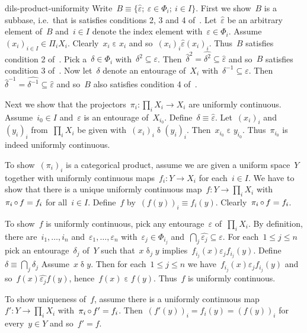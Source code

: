 \spacingfix
\begin{solution}{dils-product-uniformity}%
Write~$B \equiv \{ \hat\varepsilon; \ \varepsilon \in \Phi_i;\ i \in I\}$.
First we show~$B$ is a subbase,
    i.e.~that is satisfies conditions 2, 3 and 4
    of~.
Let~$\hat\varepsilon$ be an arbitrary element of~$B$
    and~$i \in I$ denote the index element with~$\varepsilon \in \Phi_i$.
    Assume~$(x_i)_{i \in I} \in \Pi_i X_i$.
Clearly~$x_i \mathrel\varepsilon x_i$
    and so~$(x_i)_i \mathrel{\hat\varepsilon} (x_i)_i$.
    Thus~$B$ satisfies condition 2 of~.
Pick a~$\delta \in \Phi_i$ with~$\delta^2 \subseteq \varepsilon$.
    Then~${\hat\delta}^2 =\widehat{\delta^2} \subseteq \hat{\varepsilon}$
    and so~$B$ satisfies condition 3 of~.
Now let~$\delta$ denote an entourage of~$X_i$
    with~$\delta^{-1} \subseteq \varepsilon$.
    Then~$\hat{\delta}^{-1} = \widehat{\delta^{-1}}
        \subseteq \hat{\varepsilon}$
        and so~$B$ also satisfies condition 4 of~.

Next we show that the projectors~$\pi_i \colon \prod_i X_i \to X_i$
    are uniformly continuous.
    Assume~$i_0 \in I$ and~$\varepsilon$ is an entourage of~$X_{i_0}$.
Define~$\delta \equiv \hat\varepsilon$.
    Let~$(x_i)_i$ and~$(y_i)_i$
        from~$\prod_i X_i$ be given
        with~$(x_i)_i \mathrel\delta (y_i)_i$.
    Then~$x_{i_0} \mathrel\varepsilon y_{i_0}$.
    Thus~$\pi_{i_0}$ is indeed uniformly continuous.

To show~$(\pi_i)_{i}$ is a categorical product,
    assume we are given a uniform space~$Y$ together
        with uniformly continuous maps~$f_i \colon Y \to X_i$
            for each~$i \in I$.
We have to show that there is a unique uniformly continuous 
    map~$f\colon Y \to \prod_i X_i$
        with~$\pi_i \mathop{\circ} f = f_i$ for all~$i \in I$.
    Define~$f$ by~$(f(y))_i \equiv f_i (y)$.
    Clearly~$\pi_i \mathop{\circ} f = f_i$.

    To show~$f$ is uniformly continuous,
        pick any entourage~$\varepsilon$ of~$\prod_i X_i$.
        By definition, there are~$i_1, \ldots, i_n$
            and~$\varepsilon_1, \ldots, \varepsilon_n$
            with~$\varepsilon_j \in \Phi_{i_j}$
            and~$\bigcap_j \widehat{\varepsilon_j} \subseteq \varepsilon$.
    For each~$1 \leq j \leq n$
        pick an entourage~$\delta_j$ of~$Y$
        such that~$x \mathrel\delta_j y$
        implies~$f_{i_j}(x) \mathrel{\varepsilon_j} f_{i_j}(y)$.
Define~$\delta \equiv \bigcap_j \delta_j$
    Assume~$x \mathrel\delta y$.
    Then for each~$1 \leq j \leq n$
        we have~$f_{i_j}(x) \mathrel{\varepsilon_j} f_{i_j}(y)$
            and so~$f(x) \mathrel{\widehat{\varepsilon_j}} f(y)$,
            hence~$f(x) \mathrel\varepsilon f(y)$.
        Thus~$f$ is uniformly continuous.

To show uniqueness of~$f$, assume there is a uniformly continuous
    map~$f'\colon Y \to \prod_i X_i$ with~$\pi_i \mathop{\circ} f' = f_i$.
Then~$(f'(y))_i = f_i(y) = (f(y))_i$ for every~$y \in Y$
    and so~$f' = f$.
\end{solution}
